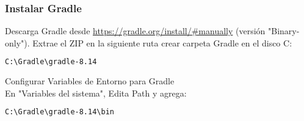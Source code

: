 \subsubsection{Instalar Gradle}
 Descarga Gradle desde \url{https://gradle.org/install/#manually} (versión "Binary-only"). Extrae el ZIP en la siguiente ruta crear carpeta Gradle en el disco C:
\begin{lstlisting}[language=bash]
 C:\Gradle\gradle-8.14
\end{lstlisting}
Configurar Variables de Entorno para Gradle\\
En "Variables del sistema", Edita Path y agrega:
\begin{lstlisting}[language=bash]
C:\Gradle\gradle-8.14\bin
\end{lstlisting}